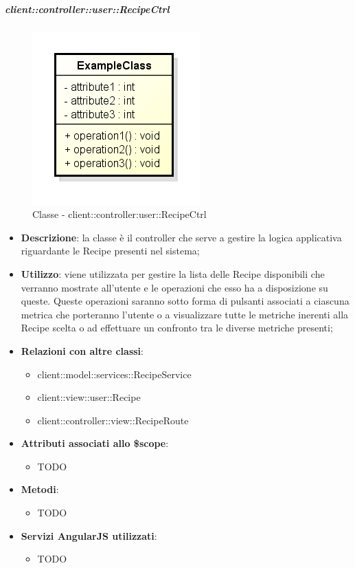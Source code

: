 		\subparagraph{client::controller::user::RecipeCtrl} %
		\label{subp:client_controller_user_recipectrl}
			\begin{figure}[htbp]
				\centering
				\centerline{\includegraphics[scale=0.7]{./images/client/classes/example_class.png}}
				\caption{Classe - client::controller:user::RecipeCtrl}
			\end{figure}
			\begin{itemize}
				\item \textbf{Descrizione}: la classe è il controller che serve a gestire la logica applicativa riguardante le Recipe presenti nel sistema;
				\item \textbf{Utilizzo}: viene utilizzata per gestire la lista delle Recipe disponibili che verranno mostrate all'utente e le operazioni che esso ha a disposizione su queste. Queste operazioni saranno sotto forma di pulsanti associati a ciascuna metrica che porteranno l'utente o a visualizzare tutte le metriche inerenti alla Recipe scelta o ad effettuare un confronto tra le diverse metriche presenti;
				\item \textbf{Relazioni con altre classi}:
					\begin{itemize}
						\item client::model::services::RecipeService
						\item client::view::user::Recipe
						\item client::controller::view::RecipeRoute
					\end{itemize}

				\item \textbf{Attributi associati allo \$scope}:
					\begin{itemize}
						\item TODO
					\end{itemize}

				\item \textbf{Metodi}:
					\begin{itemize}
						\item TODO
					\end{itemize}

				\item \textbf{Servizi AngularJS utilizzati}:
					\begin{itemize}
						\item TODO
					\end{itemize}

			\end{itemize}

